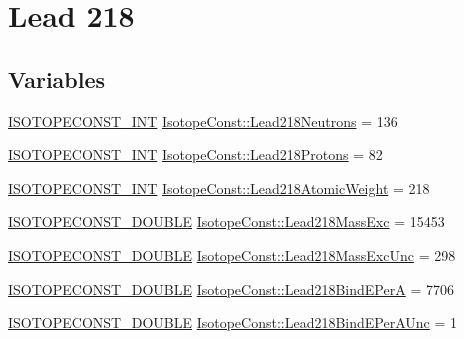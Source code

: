 \hypertarget{group___isotope_const-_lead-_pb218}{}\section{Lead 218}
\label{group___isotope_const-_lead-_pb218}
\subsection*{Variables}
\begin{DoxyCompactItemize}
\item 
\mbox{\hyperlink{group___isotope_const-_macros_ga5f18360b3e99483a35c32d789e62621c}{I\+S\+O\+T\+O\+P\+E\+C\+O\+N\+S\+T\+\_\+\+I\+NT}} \mbox{\hyperlink{group___isotope_const-_lead-_pb218_ga59297672444aab29e2c0c92a5db4c034}{Isotope\+Const\+::\+Lead218\+Neutrons}} = 136
\item 
\mbox{\hyperlink{group___isotope_const-_macros_ga5f18360b3e99483a35c32d789e62621c}{I\+S\+O\+T\+O\+P\+E\+C\+O\+N\+S\+T\+\_\+\+I\+NT}} \mbox{\hyperlink{group___isotope_const-_lead-_pb218_gaf5e40294d796905c917b6ff962cd8346}{Isotope\+Const\+::\+Lead218\+Protons}} = 82
\item 
\mbox{\hyperlink{group___isotope_const-_macros_ga5f18360b3e99483a35c32d789e62621c}{I\+S\+O\+T\+O\+P\+E\+C\+O\+N\+S\+T\+\_\+\+I\+NT}} \mbox{\hyperlink{group___isotope_const-_lead-_pb218_ga2145a84447327abc929e3489a86e669a}{Isotope\+Const\+::\+Lead218\+Atomic\+Weight}} = 218
\item 
\mbox{\hyperlink{group___isotope_const-_macros_ga8f45a7272ce02c0b4c65c44636ed719a}{I\+S\+O\+T\+O\+P\+E\+C\+O\+N\+S\+T\+\_\+\+D\+O\+U\+B\+LE}} \mbox{\hyperlink{group___isotope_const-_lead-_pb218_ga94ec2f7c5ac785120e3a4f02a18c8d71}{Isotope\+Const\+::\+Lead218\+Mass\+Exc}} = 15453
\item 
\mbox{\hyperlink{group___isotope_const-_macros_ga8f45a7272ce02c0b4c65c44636ed719a}{I\+S\+O\+T\+O\+P\+E\+C\+O\+N\+S\+T\+\_\+\+D\+O\+U\+B\+LE}} \mbox{\hyperlink{group___isotope_const-_lead-_pb218_ga020c5b90f5d7e36b56cdfcccc5c02e4d}{Isotope\+Const\+::\+Lead218\+Mass\+Exc\+Unc}} = 298
\item 
\mbox{\hyperlink{group___isotope_const-_macros_ga8f45a7272ce02c0b4c65c44636ed719a}{I\+S\+O\+T\+O\+P\+E\+C\+O\+N\+S\+T\+\_\+\+D\+O\+U\+B\+LE}} \mbox{\hyperlink{group___isotope_const-_lead-_pb218_ga3ecc08b03f9871cc650037249ba209ae}{Isotope\+Const\+::\+Lead218\+Bind\+E\+PerA}} = 7706
\item 
\mbox{\hyperlink{group___isotope_const-_macros_ga8f45a7272ce02c0b4c65c44636ed719a}{I\+S\+O\+T\+O\+P\+E\+C\+O\+N\+S\+T\+\_\+\+D\+O\+U\+B\+LE}} \mbox{\hyperlink{group___isotope_const-_lead-_pb218_gacb9ada6054f1997ce0fa611bc681fc03}{Isotope\+Const\+::\+Lead218\+Bind\+E\+Per\+A\+Unc}} = 1

\end{DoxyCompactItemize}
